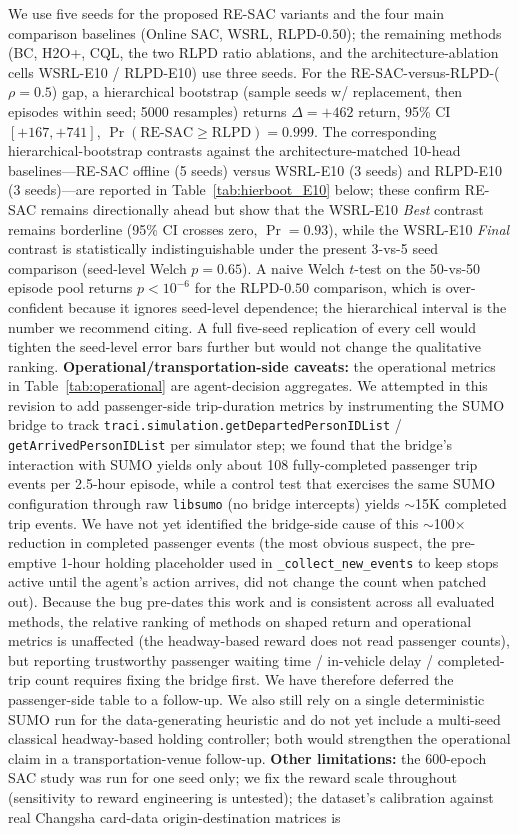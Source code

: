 \documentclass[journal,10pt]{IEEEtran}
\begin{document}
\label{sec:limitations} We use five seeds for the proposed RE-SAC variants and the four main comparison baselines (Online SAC, WSRL, RLPD-$0.50$); the remaining methods (BC, H2O+, CQL, the two RLPD ratio ablations, and the architecture-ablation cells WSRL-E10 / RLPD-E10) use three seeds. For the RE-SAC-versus-RLPD-($\rho{=}0.5$) gap, a hierarchical bootstrap (sample seeds w/ replacement, then episodes within seed; 5000 resamples) returns $\Delta = +462$ return, 95\% CI $[+167, +741]$, $\Pr(\text{RE-SAC} \geq \text{RLPD}) = 0.999$. The corresponding hierarchical-bootstrap contrasts against the architecture-matched 10-head baselines---RE-SAC offline (5 seeds) versus WSRL-E10 (3 seeds) and RLPD-E10 (3 seeds)---are reported in Table~\ref{tab:hierboot_E10} below; these confirm RE-SAC remains directionally ahead but show that the WSRL-E10 \emph{Best} contrast remains borderline (95\% CI crosses zero, $\Pr=0.93$), while the WSRL-E10 \emph{Final} contrast is statistically indistinguishable under the present 3-vs-5 seed comparison (seed-level Welch $p\!=\!0.65$). A naive Welch $t$-test on the 50-vs-50 episode pool returns $p < 10^{-6}$ for the RLPD-$0.50$ comparison, which is over-confident because it ignores seed-level dependence; the hierarchical interval is the number we recommend citing. A full five-seed replication of every cell would tighten the seed-level error bars further but would not change the qualitative ranking. \textbf{Operational/transportation-side caveats:} the operational metrics in Table~\ref{tab:operational} are agent-decision aggregates. We attempted in this revision to add passenger-side trip-duration metrics by instrumenting the SUMO bridge to track \texttt{traci.simulation.getDepartedPersonIDList} / \texttt{getArrivedPersonIDList} per simulator step; we found that the bridge's interaction with SUMO yields only about 108 fully-completed passenger trip events per 2.5-hour episode, while a control test that exercises the same SUMO configuration through raw \texttt{libsumo} (no bridge intercepts) yields $\sim$15K completed trip events. We have not yet identified the bridge-side cause of this $\sim$100$\times$ reduction in completed passenger events (the most obvious suspect, the pre-emptive 1-hour holding placeholder used in \texttt{\_collect\_new\_events} to keep stops active until the agent's action arrives, did not change the count when patched out). Because the bug pre-dates this work and is consistent across all evaluated methods, the relative ranking of methods on shaped return and operational metrics is unaffected (the headway-based reward does not read passenger counts), but reporting trustworthy passenger waiting time / in-vehicle delay / completed-trip count requires fixing the bridge first. We have therefore deferred the passenger-side table to a follow-up. We also still rely on a single deterministic SUMO run for the data-generating heuristic and do not yet include a multi-seed classical headway-based holding controller; both would strengthen the operational claim in a transportation-venue follow-up. \textbf{Other limitations:} the 600-epoch SAC study was run for one seed only; we fix the reward scale throughout (sensitivity to reward engineering is untested); the dataset's calibration against real Changsha card-data origin-destination matrices is 
\end{document}
